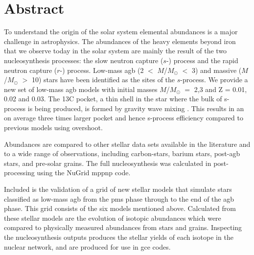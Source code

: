 \chapter{Abstract}

To understand the origin of the solar system elemental abundances is a major challenge in astrophysics. The abundances of the heavy elements beyond iron that we observe today in the solar system are mainly the result of the two nucleosynthesis processes: the slow neutron capture ($s$-) process and the rapid neutron capture ($r$-) process. 
Low-mass \acrfull{agb} (2 $<$ $M$/$M_\odot$ $<$ 3) and massive ($M$/$M_\odot$ $>$ 10) stars have been identified as the sites of the $s$-process. We provide a new set of low-mass \acrshort{agb} models with initial masses $M$/$M_\odot$ $=$ 2,3 and Z = 0.01, 0.02 and 0.03. 
The 13C pocket, a thin shell in the star where the bulk of s-process is being produced, is formed by gravity wave mixing . This results in an on average three times larger pocket and hence s-process efficiency compared to previous models using overshoot.



Abundances are compared to other stellar data sets available in the literature and to a wide range of observations, including carbon-stars, barium stars, post-\acrshort{agb} stars, and pre-solar grains. The full nucleosynthesis was calculated in post-processing using the NuGrid mppnp code.

Included is the validation of a grid of new stellar models that simulate stars classified as low-mass \acrshort{agb} from the \acrlong{pms} phase through to the end of the \acrshort{agb} phase. This grid consists of the six models mentioned above. Calculated from these stellar models are the evolution of isotopic abundances which were compared to physically measured abundances from stars and grains. Inspecting the nucleosynthesis outputs produces the stellar yields of each isotope in the nuclear network, and are produced for use in \acrfull{gce} codes.



